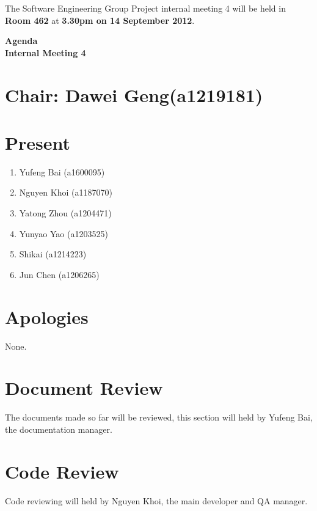 \documentclass[11pt, a4paper]{article}
\begin{document}
\noindent The Software Engineering Group Project internal meeting 4 will be held in {\bf Room 462} at {\bf 3.30pm on 14 September 2012}.


\vspace*{15pt}

\begin{center}
\huge \bf Agenda \\Internal Meeting 4
\end{center}



\section*{Chair: Dawei Geng(a1219181)}
\section*{Present}
\begin{enumerate}
\item Yufeng Bai (a1600095)
\item Nguyen Khoi (a1187070)
\item Yatong Zhou (a1204471)
\item Yunyao Yao (a1203525)
\item Shikai (a1214223)
\item Jun Chen (a1206265)
\end{enumerate}
\section{Apologies}
None.

\section{Document Review}
The documents made so far will be reviewed, this section will held by Yufeng Bai, the documentation manager.

\section{Code Review}
Code reviewing will held by Nguyen Khoi, the main developer and QA manager.
\end{document}
